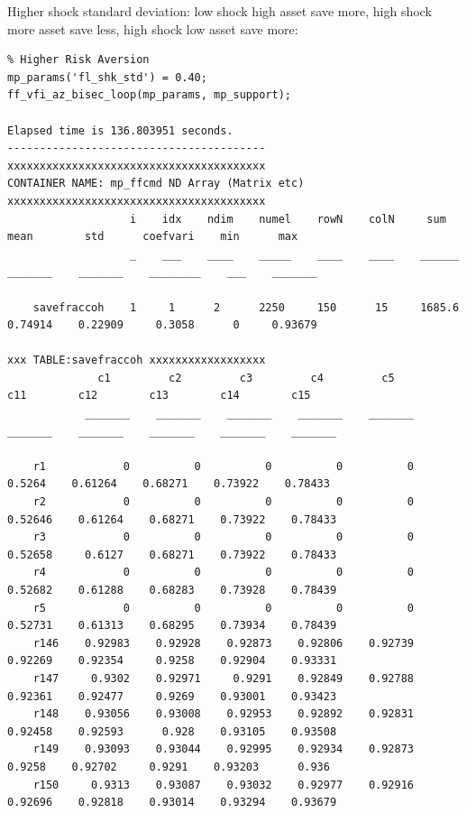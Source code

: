 \documentclass[
]{book}
\begin{document}
Higher shock standard deviation: low shock high asset save more, high
shock more asset save less, high shock low asset save more:

\begin{verbatim}
% Higher Risk Aversion
mp_params('fl_shk_std') = 0.40;
ff_vfi_az_bisec_loop(mp_params, mp_support);

Elapsed time is 136.803951 seconds.
----------------------------------------
xxxxxxxxxxxxxxxxxxxxxxxxxxxxxxxxxxxxxxxx
CONTAINER NAME: mp_ffcmd ND Array (Matrix etc)
xxxxxxxxxxxxxxxxxxxxxxxxxxxxxxxxxxxxxxxx
                   i    idx    ndim    numel    rowN    colN     sum       mean        std      coefvari    min      max  
                   _    ___    ____    _____    ____    ____    ______    _______    _______    ________    ___    _______

    savefraccoh    1     1      2      2250     150      15     1685.6    0.74914    0.22909     0.3058      0     0.93679

xxx TABLE:savefraccoh xxxxxxxxxxxxxxxxxx
              c1         c2         c3         c4         c5         c11        c12        c13        c14        c15  
            _______    _______    _______    _______    _______    _______    _______    _______    _______    _______

    r1            0          0          0          0          0     0.5264    0.61264    0.68271    0.73922    0.78433
    r2            0          0          0          0          0    0.52646    0.61264    0.68271    0.73922    0.78433
    r3            0          0          0          0          0    0.52658     0.6127    0.68271    0.73922    0.78433
    r4            0          0          0          0          0    0.52682    0.61288    0.68283    0.73928    0.78439
    r5            0          0          0          0          0    0.52731    0.61313    0.68295    0.73934    0.78439
    r146    0.92983    0.92928    0.92873    0.92806    0.92739    0.92269    0.92354     0.9258    0.92904    0.93331
    r147     0.9302    0.92971     0.9291    0.92849    0.92788    0.92361    0.92477     0.9269    0.93001    0.93423
    r148    0.93056    0.93008    0.92953    0.92892    0.92831    0.92458    0.92593      0.928    0.93105    0.93508
    r149    0.93093    0.93044    0.92995    0.92934    0.92873     0.9258    0.92702     0.9291    0.93203      0.936
    r150     0.9313    0.93087    0.93032    0.92977    0.92916    0.92696    0.92818    0.93014    0.93294    0.93679
\end{verbatim}
\end{document}
